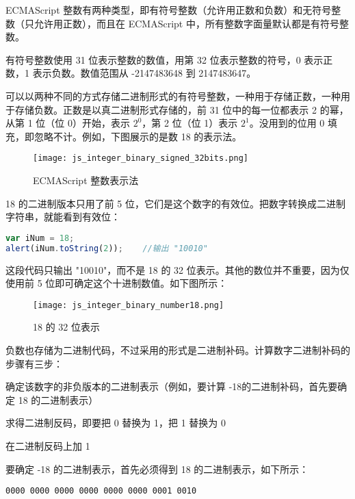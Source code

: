 ECMAScript 整数有两种类型，即有符号整数（允许用正数和负数）和无符号整数（只允许用正数），而且在 ECMAScript 中，所有整数字面量默认都是有符号整数。

有符号整数使用 31 位表示整数的数值，用第 32 位表示整数的符号，0 表示正数，1 表示负数。数值范围从 -2147483648 到 2147483647。

可以以两种不同的方式存储二进制形式的有符号整数，一种用于存储正数，一种用于存储负数。正数是以真二进制形式存储的，前 31 位中的每一位都表示 2 的幂，从第 1 位（位 0）开始，表示 $\text{2}^{\text{0}}$，第 2 位（位 1）表示 $\text{2}^{\text{1}}$。没用到的位用 0 填充，即忽略不计。例如，下图展示的是数 18 的表示法。

\begin{figure}[!h]
\centering
\texttt{[image: js\_integer\_binary\_signed\_32bits.png]}
\caption{ECMAScript 整数表示法}
\label{js_integer_binary_signed_32bits}
\end{figure}

18 的二进制版本只用了前 5 位，它们是这个数字的有效位。把数字转换成二进制字符串，就能看到有效位：


\begin{lstlisting}[language=JavaScript]
var iNum = 18;
alert(iNum.toString(2));	//输出 "10010"
\end{lstlisting}

这段代码只输出 "10010"，而不是 18 的 32 位表示。其他的数位并不重要，因为仅使用前 5 位即可确定这个十进制数值。如下图所示：

\begin{figure}[!h]
\centering
\texttt{[image: js\_integer\_binary\_number18.png]}
\caption{18 的 32 位表示}
\label{js_integer_binary_number18}
\end{figure}


负数也存储为二进制代码，不过采用的形式是二进制补码。计算数字二进制补码的步骤有三步：

\begin{compactenum}
\item 确定该数字的非负版本的二进制表示（例如，要计算 -18的二进制补码，首先要确定 18 的二进制表示）
\item 求得二进制反码，即要把 0 替换为 1，把 1 替换为 0
\item 在二进制反码上加 1
\end{compactenum}

要确定 -18 的二进制表示，首先必须得到 18 的二进制表示，如下所示：

\verb|0000 0000 0000 0000 0000 0000 0001 0010|

